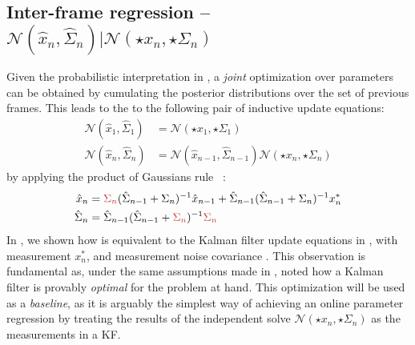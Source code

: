 \subsection{Inter-frame regression -- $\mathcal{N}(\hat{x}_n, \hat{\Sigma}_n) | \mathcal{N}(\star{x}_n, \star{\Sigma}_n)$ } 
\label{sec:combining}
\label{sec:inter}
Given the probabilistic interpretation in , a \emph{joint} optimization over parameters can be obtained by cumulating the posterior distributions over the set of previous frames. This leads to the to the following pair of inductive update equations:
% 
\begin{align}
\mathcal{N}(\hat{x}_1, \hat{\Sigma}_1) &= \mathcal{N}(\star{x}_1, \star{\Sigma}_1) \\
\mathcal{N}(\hat{x}_n, \hat{\Sigma}_n) &= \mathcal{N}(\hat{x}_{n-1}, \hat{\Sigma}_{n-1}) \mathcal{N}(\star{x}_n, \star{\Sigma}_n)
\end{align}
% 
by applying the product of Gaussians rule ~\cite{petersen2008matrix}:
% 
\begin{align}
\begin{split}
\hat{x}_{n} &= \todo{\Sigma_{n}} (\hat{\Sigma}_{n-1} + \Sigma_{n})^{-1} \hat{x}_{n-1} + 
\hat{\Sigma}_{n-1} (\hat{\Sigma}_{n-1} + \Sigma_n)^{-1} x_n^*
\\
\hat{\Sigma}_n &= \hat{\Sigma}_{n-1} (\hat{\Sigma}_{n-1} + \todo{\Sigma_n})^{-1} \todo{\Sigma_n}
\label{eq:combining}
\end{split}
\end{align}
% 
In , we shown how  is equivalent to the Kalman filter update equations in , with measurement $x_n^*$, and measurement noise covariance . This observation is fundamental as, under the same assumptions made in , \cite{maybeck1979stochastic} noted how a Kalman filter is provably \emph{optimal} for the problem at hand.
This optimization will be used as a \emph{baseline}, as it is arguably the simplest way of achieving an online parameter regression by treating the results of the independent solve $\mathcal{N}(\star{x}_n, \star{\Sigma}_n)$ as the measurements in a KF.

